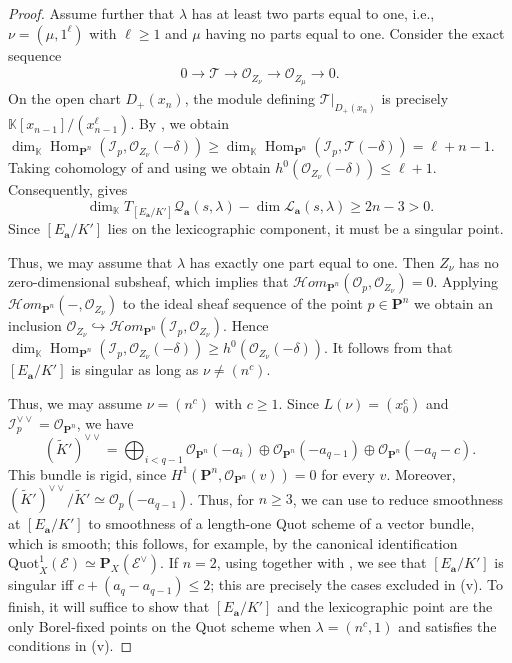 \documentclass[leqno,11pt,a4paper]{amsart}
\theoremstyle{definition}
\numberwithin{equation}{section}
\newcommand{\kk}{\mathbb{K}}
\newcommand{\bfa}{\mathbf{a}}
\newcommand{\Quot}{\mathrm{Quot}}
\newcommand{\PP}{\mathbf{P}}
\newcommand{\EE}{\mathscr{E}}
\newcommand{\OO}{\mathscr{O}}
\newcommand{\II}{\mathscr{I}}
\newcommand{\HH}{\mathcal{H}}
\newcommand{\LL}{\mathcal{L}}
\newcommand{\QQ}{\mathcal{Q}}
\DeclareMathOperator{\Hom}{Hom}
\begin{document}
\begin{proof}
Assume further that $\lambda$ has at least two parts equal to one, i.e., $\nu=(\mu,1^\ell)$ with $\ell\geq1$ and $\mu$ having no parts equal to one. 
Consider the exact sequence
\begin{align} \label{Torsion_exact}
0 \longrightarrow \mathscr{T} \longrightarrow \OO_{Z_\nu} \longrightarrow \OO_{Z_\mu} \longrightarrow 0.
\end{align}
On the open chart $D_{+}(x_n)$, the module defining $\mathscr{T}|_{D_{+}(x_n)}$ is precisely $\kk[x_{n-1}]/(x_{n-1}^\ell)$.
By , we obtain $\dim_\kk\Hom_{\PP^n}(\II_p,\OO_{Z_{\nu}}(-\delta)) \geq \dim_\kk\Hom_{\PP^n}(\II_p,\mathscr{T}(-\delta)) = \ell+n-1$.
Taking cohomology of  and using  we obtain
$h^0(\OO_{Z_\nu}(-\delta))\leq\ell+1$.
Consequently, 
gives
$$
\dim_\kk T_{[E_{\bfa}/K']}\QQ_{\bfa}(s,\lambda) - \dim\LL_{\bfa}(s,\lambda) \geq 2n-3>0.
$$
Since $[E_{\bfa}/K']$ lies on the lexicographic component, it must be a singular point.

Thus, we may assume that $\lambda$ has exactly one part equal to one. 
Then $Z_\nu$ has no zero-dimensional subsheaf, which implies that $\HH om_{\PP^n}(\OO_p,\OO_{Z_{\nu}})= 0$.
Applying $\HH om_{\PP^n}(-,\OO_{Z_{\nu}})$ to the ideal sheaf sequence of the point $p\in \PP^n$ we obtain an inclusion $\OO_{Z_\nu}\hookrightarrow \mathcal{H}om_{\PP^n}(\II_p,\OO_{Z_\nu})$.
Hence $\dim_\kk\Hom_{\PP^n}(\II_p,\OO_{Z_{\nu}}(-\delta)) \geq h^0(\OO_{Z_\nu}(-\delta))$. 
It follows from  that $[E_\bfa/K']$ is singular as long as $\nu \ne (n^c)$.

Thus, we may assume $\nu=(n^c)$ with $c\geq1$. 
Since $L(\nu)=(x_0^c)$ and $\II_p^{\vee\vee}=\OO_{\PP^n}$, we have
$$
(\widetilde K')^{\vee\vee} = \bigoplus_{i<q-1}\OO_{\PP^n}(-a_i) \oplus \OO_{\PP^n}(-a_{q-1}) \oplus \OO_{\PP^n}(-a_q-c).
$$
This bundle is rigid, since $H^1(\PP^n,\OO_{\PP^n}(v))=0$ for every $v$.
Moreover, $(\widetilde K')^{\vee\vee}/\widetilde K' \simeq \OO_p(-a_{q-1})$.
Thus, for $n\geq3$, we can use  to reduce smoothness at $[E_{\bfa}/K']$ to smoothness of a length-one Quot scheme of a vector bundle, which is smooth; this follows, for example, by the canonical identification $\Quot^{1}_X(\EE) \simeq \PP_X(\EE^{\vee})$.
If $n=2$, using  together with , we see that $[E_\bfa/K']$ is singular iff $c+ (a_q - a_{q-1}) \leq 2$; this are precisely the cases excluded in (v). 
To finish, it will suffice to show that $[E_\bfa/K']$ and the lexicographic point are the only Borel-fixed points on the Quot scheme when $\lambda = (n^c,1)$ and satisfies the conditions in (v).


\end{proof}
\end{document}
